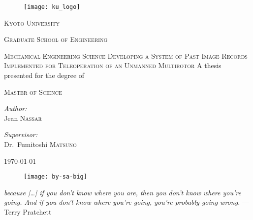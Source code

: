 \begin{titlepage}
  \begin{center}
    \noindent

    \begin{figure}[h]
      \centering
      \texttt{[image: ku\_logo]}
    \end{figure}
    \textsc{\LARGE Kyoto University}
    
    \textsc{\Large Graduate School of Engineering}

    \textsc{\large Mechanical Engineering Science}
    \vfill\vfill
    \textsc{\large Developing a System of Past Image Records Implemented for Teleoperation of an Unmanned Multirotor}  %
    \vfill\vfill
    {\large A thesis presented for the degree of}

    \textsc{\large Master of Science}
    \vfill\vfill
    \begin{minipage}[t]{0.4\textwidth}
      \begin{flushleft}
	\emph{Author:}\\
	Jean \textsc{Nassar}
      \end{flushleft}
    \end{minipage}
    \begin{minipage}[t]{0.4\textwidth}
      \begin{flushright}
	\emph{Supervisor:}\\
	Dr.~Fumitoshi \textsc{Matsuno}
      \end{flushright}
    \end{minipage}
    \vfill
    \today
    \begin{figure}[h]
      \centering
      \texttt{[image: by-sa-big]}
    \end{figure}
  \end{center}
\end{titlepage}

\thispagestyle{empty}
  \null{}
    \begin{flushright}
      \emph{
	because [\ldots] if you don’t know where you are, then you don’t know where you’re going.
	And if you don’t know where you’re going, you’re probably going wrong.
      } --- Terry Pratchett
    \end{flushright}
  \null

